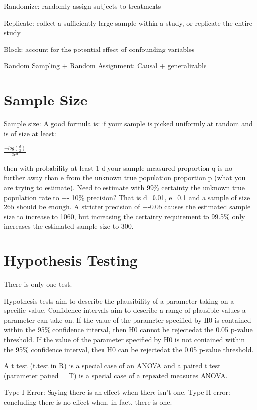 \documentclass[]{book}
\begin{document}
Randomize: randomly assign subjects to treatments

Replicate: collect a sufficiently large sample within a study, or replicate the entire study

Block: account for the potential effect of confounding variables

Random Sampling + Random Assignment: Causal + generalizable

\hypertarget{sample-size}{%
\section{Sample Size}\label{sample-size}}

Sample size: A good formula is: if your sample is picked uniformly at random and is of size at least:

\(\frac{-log(\frac{d}{2})}{2e^2}\)

then with probability at least 1-d your sample measured proportion q is no further away than e from the unknown true population proportion p (what you are trying to estimate). Need to estimate with 99\% certainty the unknown true population rate to +- 10\% precision? That is d=0.01, e=0.1 and a sample of size 265 should be enough. A stricter precision of +-0.05 causes the estimated sample size to increase to 1060, but increasing the certainty requirement to 99.5\% only increases the estimated sample size to 300.

\hypertarget{hypothesis-testing}{%
\section{Hypothesis Testing}\label{hypothesis-testing}}

There is only one test.

Hypothesis tests aim to describe the plausibility of a parameter taking on a specific value. Confidence intervals aim to describe a range of plausible values a parameter can take on. If the value of the parameter specified by H0 is contained within the 95\% confidence interval, then H0 cannot be rejectedat the 0.05 p-value threshold. If the value of the parameter specified by H0 is not contained within the 95\% confidence interval, then H0 can be rejectedat the 0.05 p-value threshold.

A t test (t.test in R) is a special case of an ANOVA and a paired t test (parameter paired = T) is a special case of a repeated measures ANOVA.

Type I Error: Saying there is an effect when there isn't one. Type II error: concluding there is no effect when, in fact, there is one.
\end{document}
